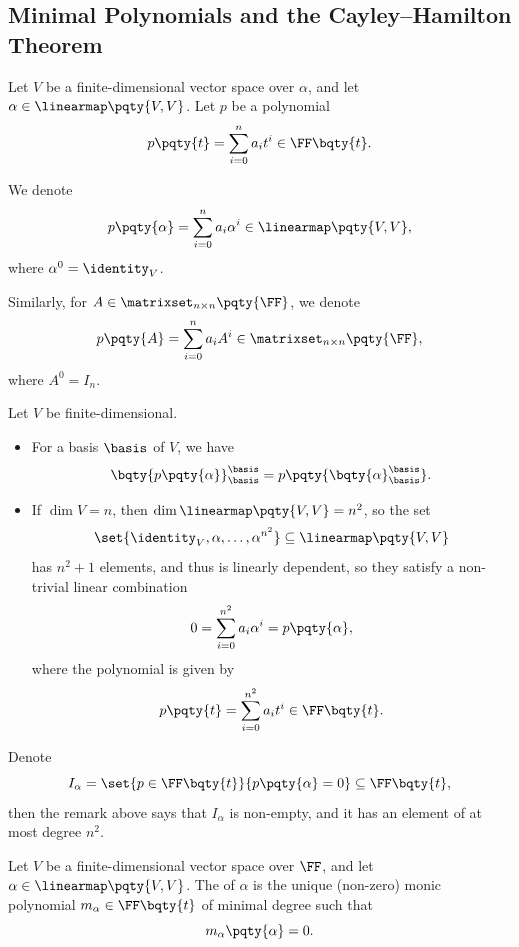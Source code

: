 \subsection{Minimal Polynomials and the Cayley--Hamilton Theorem}

\begin{definition}
    Let \(V\) be a finite-dimensional vector space over \(\alpha\), and let \(\alpha \in \linearmap\pqty{V, V}\). Let \(p\) be a polynomial
    \[
        p\pqty{t} = \sum_{i = 0}^{n} a_i t^i \in \FF\bqty{t}.
    \]

    We denote
    \[
        p\pqty{\alpha} = \sum_{i = 0}^{n} a_i \alpha^i \in \linearmap\pqty{V, V},
    \]
    where \(\alpha^0 = \identity_V\).

    Similarly, for \(A \in \matrixset_{n \times n} \pqty{\FF}\), we denote
    \[
        p\pqty{A} = \sum_{i = 0}^{n} a_i A^i \in \matrixset_{n \times n} \pqty{\FF},
    \]
    where \(A^0 = I_n\).
\end{definition}

\begin{remarks}
    Let \(V\) be finite-dimensional.
    \begin{itemize}
        \item For a basis \(\basis\) of \(V\), we have
        \[
            \bqty{p\pqty{\alpha}}_{\basis}^{\basis} = p\pqty{\bqty{\alpha}_{\basis}^{\basis}}.
        \]

        \item If \(\dim V = n\), then \(\dim \linearmap\pqty{V, V} = n^2\), so the set
        \[
            \set{\identity_V, \alpha, \ldots, \alpha^{n^2}} \subseteq \linearmap\pqty{V, V}
        \]
        has \(n^2 + 1\) elements, and thus is linearly dependent, so they satisfy a non-trivial linear combination
        \[
            0 = \sum_{i = 0}^{n^2} a_i \alpha^i = p\pqty{\alpha},
        \]
        where the polynomial is given by
        \[
            p\pqty{t} = \sum_{i = 0}^{n^2} a_i t^i \in \FF\bqty{t}.
        \]
    \end{itemize}
\end{remarks}

Denote
\[
    I_\alpha = \set{p \in \FF\bqty{t}}{p\pqty{\alpha} = 0} \subseteq \FF\bqty{t},
\]
then the remark above says that \(I_\alpha\) is non-empty, and it has an element of at most degree \(n^2\).

\begin{definition}
    Let \(V\) be a finite-dimensional vector space over \(\FF\), and let \(\alpha \in \linearmap\pqty{V, V}\). The  of \(\alpha\) is the unique (non-zero) monic polynomial \(m_\alpha \in \FF\bqty{t}\) of minimal degree such that
    \[
        m_\alpha\pqty{\alpha} = 0.
    \]
\end{definition}


